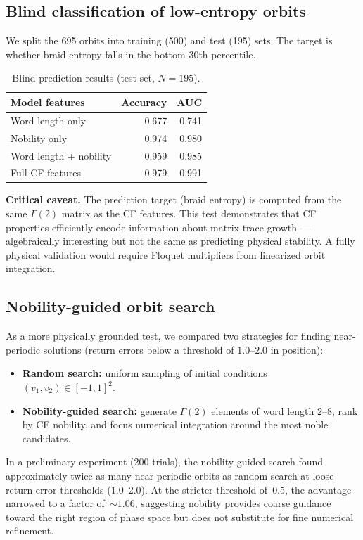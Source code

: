 \documentclass[11pt]{article}
\theoremstyle{definition}
\begin{document}
\subsection{Blind classification of low-entropy orbits}

We split the 695 orbits into training (500) and test (195) sets.
The target is whether braid entropy falls in the bottom 30th
percentile.

\begin{table}[ht]
\centering
\caption{Blind prediction results (test set, $N = 195$).}
\label{tab:prediction}
\begin{tabular}{lrr}
\toprule
Model features & Accuracy & AUC \\
\midrule
Word length only & 0.677 & 0.741 \\
Nobility only & 0.974 & 0.980 \\
Word length + nobility & 0.959 & 0.985 \\
Full CF features & 0.979 & 0.991 \\
\bottomrule
\end{tabular}
\end{table}

\textbf{Critical caveat.} The prediction target (braid entropy) is
computed from the same $\Gamma(2)$ matrix as the CF features. This
test demonstrates that CF properties efficiently encode information
about matrix trace growth --- algebraically interesting but not the
same as predicting physical stability. A fully physical validation
would require Floquet multipliers from linearized orbit integration.

\subsection{Nobility-guided orbit search}

As a more physically grounded test, we compared two strategies for
finding near-periodic solutions (return errors below a threshold of
$1.0$--$2.0$ in position):
\begin{itemize}
\item \textbf{Random search:} uniform sampling of initial conditions
  $(v_1, v_2) \in [-1,1]^2$.
\item \textbf{Nobility-guided search:} generate $\Gamma(2)$ elements
  of word length $2$--$8$, rank by CF nobility, and focus numerical
  integration around the most noble candidates.
\end{itemize}
In a preliminary experiment (200 trials), the nobility-guided search
found approximately twice as many near-periodic orbits as random
search at loose return-error thresholds ($1.0$--$2.0$).  At the
stricter threshold of~$0.5$, the advantage narrowed to a factor
of~${\sim}\!1.06$, suggesting nobility provides coarse guidance
toward the right region of phase space but does not substitute for
fine numerical refinement.
\end{document}
